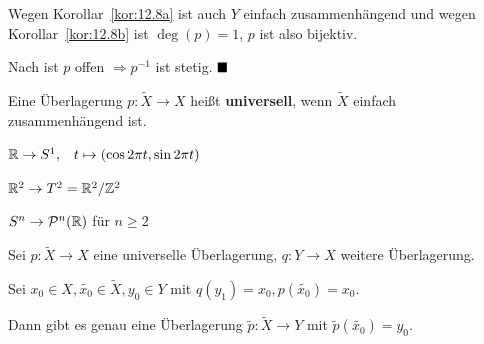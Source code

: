 \begin{beweis}
    Wegen Korollar~\ref{kor:12.8a} ist auch $Y$ einfach zusammenhängend
    und wegen Korollar~\ref{kor:12.8b} ist $\deg(p)=1$, $p$ ist also
    bijektiv.

    Nach  ist $p$ offen $\Rightarrow p^{-1}$
    ist stetig. $\qed$
\end{beweis}

\begin{definition}%
    Eine Überlagerung $p: \tilde{X} \rightarrow X$ heißt
    \textbf{universell}, wenn
    $\tilde{X}$ einfach zusammenhängend ist.
\end{definition}

\begin{beispiel}
    $\mathbb{R} \rightarrow S^1, \;\;\; t \mapsto (\cos 2 \pi t, \sin 2 \pi t)$

    $\mathbb{R}^2 \rightarrow T^2 = \mathbb{R}^2 / \mathbb{Z}^2$

    $S^n \rightarrow \mathcal{P}^n(\mathbb{R})$ für $n \geq 2$
\end{beispiel}

\begin{satz}\label{thm:12.11}%
    Sei $p: \tilde{X} \rightarrow X$ eine universelle Überlagerung,
    $q:Y \rightarrow X$ weitere Überlagerung.

    Sei $x_0 \in X, \tilde{x_0} \in \tilde{X}, y_0 \in Y$ mit
    $q(y_1) = x_0, p(\tilde{x_0}) = x_0$.

    Dann gibt es genau eine Überlagerung $\tilde{p}: \tilde{X} \rightarrow Y$
    mit $\tilde{p}(\tilde{x_0}) = y_0$.
\end{satz}

